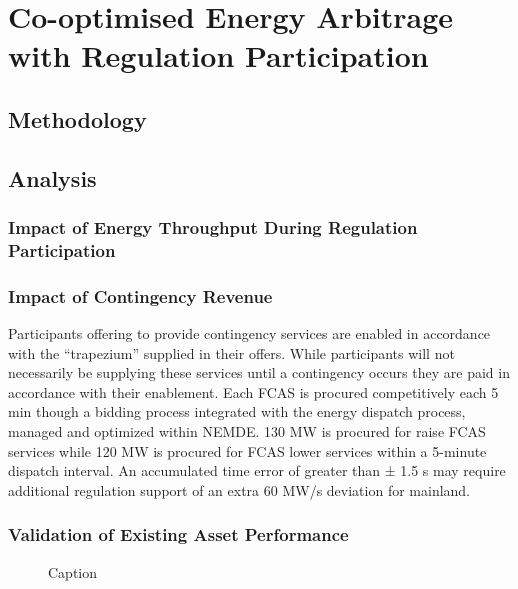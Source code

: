\chapter{Co-optimised Energy Arbitrage with Regulation Participation}
\section{ Methodology }
\section{ Analysis }
\subsection{  Impact of Energy Throughput During Regulation Participation }
\subsection{ Impact of  Contingency Revenue }
Participants offering to provide contingency services are enabled in accordance with the “trapezium” supplied in their offers. While participants will not necessarily be supplying these services until a contingency occurs they are paid in accordance with their enablement.
Each FCAS is procured competitively each 5 min though a bidding process integrated with the energy dispatch process, managed and optimized within NEMDE. 130 MW is procured for raise FCAS services while 120 MW is procured for FCAS lower services within a 5-minute dispatch interval. An accumulated time error of greater than ± 1.5 s may require additional regulation
support of an extra 60 MW/s deviation for mainland.
\subsection{ Validation of Existing Asset Performance  }
\begin{figure}[H]
    \centering
    \caption{Caption}
    \label{fig:my_label}
\end{figure}